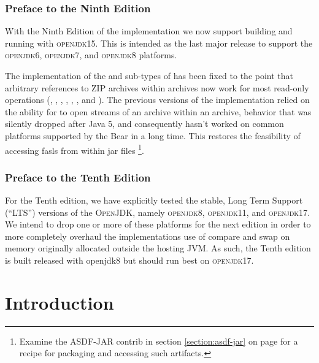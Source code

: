 \documentclass[10pt]{book}
\begin{document}
\subsection{Preface to the Ninth Edition}
With the Ninth Edition of the implementation we now support building
and running with \textsc{openjdk15}.  This is intended as the last
major release to support the \textsc{openjdk6}, \textsc{openjdk7}, and
\textsc{openjdk8} platforms.

The implementation of the  and
 sub-types of  has been fixed
to the point that arbitrary references to \textsc{ZIP} archives within
archives now work for most read-only operations (,
, , ,
, , and
).  The previous versions of the
implementation relied on the ability for  to open
streams of an archive within an archive, behavior that was silently
dropped after Java 5, and consequently hasn't worked on common
platforms supported by the Bear in a long time.  This restores the
feasibility of accessing fasls from within jar files \footnote{Examine
the ASDF-JAR contrib in section \ref{section:asdf-jar} on page
\pageref{section:asdf-jar} for a recipe for packaging and accessing
such artifacts.}.

\subsection{Preface to the Tenth Edition}

For the Tenth edition, we have explicitly tested the stable, Long Term
Support (``LTS'') versions of the \textsc{OpenJDK}, namely \textsc{openjdk8},
\textsc{openjdk11}, and \textsc{openjdk17}.  We intend to drop one or
more of these platforms for the next edition in order to more
completely overhaul the implementations use of compare and swap on
memory originally allocated outside the hosting \textsc{JVM}.  As such, the
Tenth edition is built released with openjdk8 but should run best on
\textsc{openjdk17}.  

\chapter{Introduction}
\end{document}
